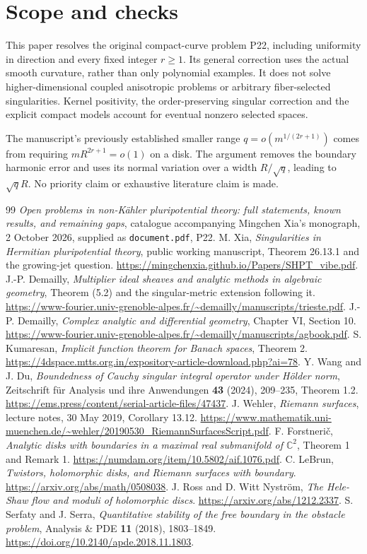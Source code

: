 \documentclass[11pt]{article}
\theoremstyle{remark}\newtheorem{remark}[theorem]{Remark}
\begin{document}
\section{Scope and checks}
This paper resolves the original compact-curve problem P22, including
uniformity in direction and every fixed integer $r\geq1$. Its general
correction uses the actual smooth curvature, rather than only polynomial
examples. It does not solve higher-dimensional coupled anisotropic
problems or arbitrary fiber-selected singularities. Kernel positivity,
the order-preserving singular correction and the explicit compact
models account for eventual nonzero selected spaces.

The manuscript's previously established smaller range
$q=o(m^{1/(2r+1)})$ comes from requiring $mR^{2r+1}=o(1)$ on a disk.
The argument removes the boundary harmonic error and uses its
normal variation over a width $R/\sqrt q$, leading to $\sqrt q R$.
No priority claim or exhaustive literature claim is made.

\begin{thebibliography}{99}
\emph{Open problems in non-K\"ahler pluripotential theory: full statements,
known results, and remaining gaps}, catalogue accompanying Mingchen Xia's
monograph, 2 October 2026, supplied as \texttt{document.pdf}, P22.
M. Xia, \emph{Singularities in Hermitian pluripotential theory}, public
working manuscript, Theorem 26.13.1 and the growing-jet question.
\url{https://mingchenxia.github.io/Papers/SHPT_vibe.pdf}.
 J.-P. Demailly,
\emph{Multiplier ideal sheaves and analytic methods in algebraic geometry},
Theorem (5.2) and the singular-metric extension following it.
\url{https://www-fourier.univ-grenoble-alpes.fr/~demailly/manuscripts/trieste.pdf}.
 J.-P. Demailly,
\emph{Complex analytic and differential geometry}, Chapter VI, Section 10.
\url{https://www-fourier.univ-grenoble-alpes.fr/~demailly/manuscripts/agbook.pdf}.
 S. Kumaresan,
\emph{Implicit function theorem for Banach spaces}, Theorem 2.
\url{https://4dspace.mtts.org.in/expository-article-download.php?ai=78}.
 Y. Wang and J. Du,
\emph{Boundedness of Cauchy singular integral operator under H\"older norm},
Zeitschrift f\"ur Analysis und ihre Anwendungen \textbf{43} (2024),
209--235, Theorem 1.2.
\url{https://ems.press/content/serial-article-files/47437}.
 J. Wehler,
\emph{Riemann surfaces}, lecture notes, 30 May 2019, Corollary 13.12.
\url{https://www.mathematik.uni-muenchen.de/~wehler/20190530_RiemannSurfacesScript.pdf}.
 F. Forstneri\v c,
\emph{Analytic disks with boundaries in a maximal real submanifold of
$\mathbb C^2$}, Theorem 1 and Remark 1.
\url{https://numdam.org/item/10.5802/aif.1076.pdf}.
 C. LeBrun,
\emph{Twistors, holomorphic disks, and Riemann surfaces with boundary}.
\url{https://arxiv.org/abs/math/0508038}.
 J. Ross and D. Witt Nystr\"om,
\emph{The Hele-Shaw flow and moduli of holomorphic discs}.
\url{https://arxiv.org/abs/1212.2337}.
 S. Serfaty and J. Serra,
\emph{Quantitative stability of the free boundary in the obstacle problem},
Analysis \& PDE \textbf{11} (2018), 1803--1849.
\url{https://doi.org/10.2140/apde.2018.11.1803}.
\end{thebibliography}
\end{document}
